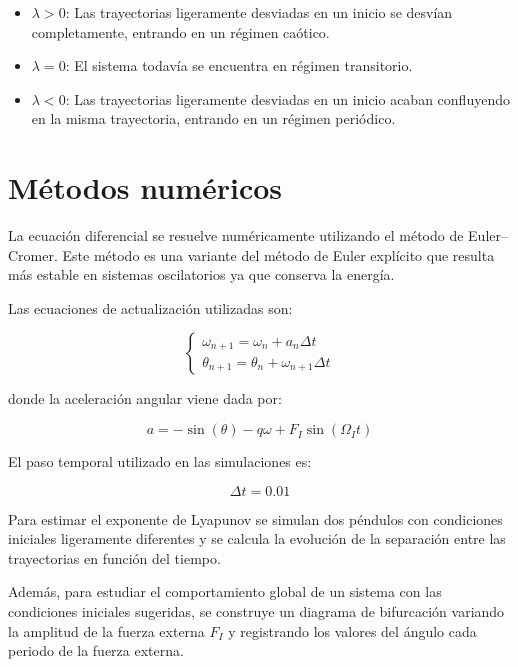 \documentclass[11pt,a4paper]{article}
\begin{document}
\begin{itemize}

\item $\lambda>0$: Las trayectorias ligeramente desviadas en un inicio se desvían completamente, entrando en un régimen caótico.

\item $\lambda=0$: El sistema todavía se encuentra en régimen transitorio.

\item $\lambda<0$: Las trayectorias ligeramente desviadas en un inicio acaban confluyendo en la misma trayectoria, entrando en un régimen periódico.

\end{itemize}

\section{Métodos numéricos}

La ecuación diferencial se resuelve numéricamente utilizando el método de Euler–Cromer. \cite{giordano} Este método es una variante del método de Euler explícito que resulta más estable en sistemas oscilatorios ya que conserva la energía.

Las ecuaciones de actualización utilizadas son:

\begin{equation}
\begin{cases}
\omega_{n+1} = \omega_n + a_n \Delta t \\
\theta_{n+1} = \theta_n + \omega_{n+1} \Delta t
\end{cases}
\end{equation}

donde la aceleración angular viene dada por:

\begin{equation}
a = -\sin(\theta) - q\omega + F_I\sin(\Omega_I t)
\end{equation}

El paso temporal utilizado en las simulaciones es:

\[
\Delta t = 0.01
\]

Para estimar el exponente de Lyapunov se simulan dos péndulos con condiciones iniciales ligeramente diferentes y se calcula la evolución de la separación entre las trayectorias en función del tiempo.

Además, para estudiar el comportamiento global de un sistema con las condiciones iniciales sugeridas, se construye un diagrama de bifurcación variando la amplitud de la fuerza externa $F_I$ y registrando los valores del ángulo cada periodo de la fuerza externa.
\end{document}
